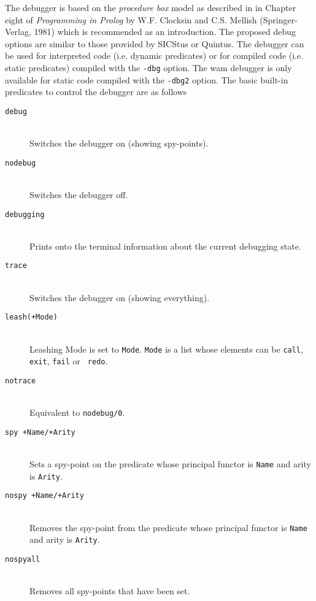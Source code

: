 The debugger is based on the {\em procedure box} model as described in
in Chapter eight of {\em Programming in Prolog} by W.F. Clocksin and
C.S. Mellish (Springer-Verlag, 1981) which is recommended as an introduction.
The proposed debug options are similar to those provided by SICStus or
Quintus.
The debugger can be used for interpreted code (i.e. dynamic
predicates) or for compiled code (i.e. static predicates) compiled
with the {\tt -dbg} option. The wam debugger is only available for
static code compiled with the {\tt -dbg2} option.
The basic built-in predicates to control the debugger are as follows

\begin{description}

\item [{\tt debug}]~\\
	Switches the debugger on (showing spy-points).

\item [{\tt nodebug}]~\\
	Switches the debugger off.

\item [{\tt debugging}]~\\
	Prints onto the terminal information about the current
	debugging state. 

\item [{\tt trace}]~\\
	Switches the debugger on (showing everything).

\item [{\tt leash(+Mode)}]~\\
	Leashing Mode is set to {\tt Mode}.  {\tt Mode} is a list
	whose elements can be {\tt call}, {\tt exit}, {\tt fail} or {\tt
	redo}.	

\item [{\tt notrace}]~\\
	Equivalent to {\tt nodebug/0}.

\item [{\tt spy +Name/+Arity}]~\\
	Sets a spy-point on the predicate whose principal functor is
	{\tt Name} and arity is {\tt Arity}.

\item [{\tt nospy +Name/+Arity}]~\\
	Removes the spy-point from the predicate whose principal functor is
	{\tt Name} and arity is {\tt Arity}.

\item [{\tt nospyall}]~\\
	Removes all spy-points that have been set.

\end{description}

